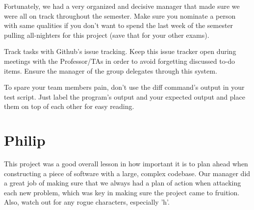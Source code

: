\begin{homeworkProblem}
	Fortunately, we had a very organized and decisive manager that made sure we were all on track throughout the semester. Make sure you nominate a person with same qualities if you don't want to spend the last week of the semester pulling all-nighters for this project (save that for your other exams).
	
	Track tasks with Github's issue tracking. Keep this issue tracker open during meetings with the Professor/TAs in order to avoid forgetting discussed to-do items. Ensure the manager of the group delegates through this system.
	
	To spare your team members pain, don't use the diff command's output in your test script. Just label the program's output and your expected output and place them on top of each other for easy reading. 
	\section{Philip}
	This project was a good overall lesson in how important it is to plan ahead when constructing a piece of software with a large, complex codebase. Our manager did a great job of making sure that we always had a plan of action when attacking each new problem, which was key in making sure the project came to fruition. Also, watch out for any rogue characters, especially 'h'.
\end{homeworkProblem}